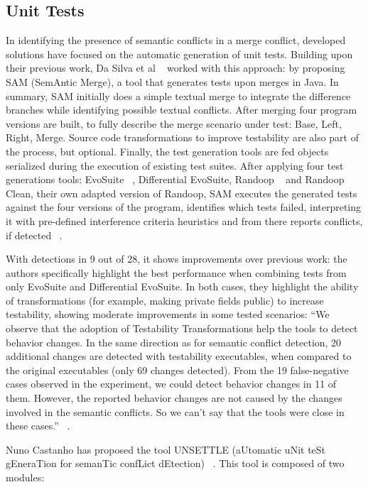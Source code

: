 \subsection{Unit Tests}

In identifying the presence of semantic conflicts in a merge conflict, developed solutions have focused on the automatic generation of unit tests. Building upon their previous work, Da Silva et al ~\citep{kn:leuson2} worked with this approach: by proposing SAM (SemAntic Merge), a tool that generates tests upon merges in Java. In summary, SAM initially does a simple textual merge to integrate the difference branches while identifying possible textual conflicts. After merging four program versions are built, to fully describe the merge scenario under test: Base, Left, Right, Merge. Source code transformations to improve testability are also part of the process, but optional. Finally, the test generation tools are fed objects serialized during the execution of existing test suites. After applying four test generations tools: EvoSuite ~\citep{kn:evosuite}, Differential EvoSuite, Randoop ~\citep{kn:randoop} and Randoop Clean, their own adapted version of Randoop, SAM executes the generated tests against the four versions of the program, identifies which tests failed, interpreting it with pre-defined interference criteria heuristics and from there reports conflicts, if detected ~\citep{kn:leuson2}.

With detections in 9 out of 28, it shows improvements over previous work: the authors specifically highlight the best performance when combining tests from only EvoSuite and Differential EvoSuite. In both cases, they highlight the ability of transformations (for example, making private fields public) to increase testability, showing moderate improvements in some tested scenarios: ``We observe that the adoption of Testability Transformations help the tools
to detect behavior changes. In the same direction as for semantic conflict
detection, 20 additional changes are detected with testability executables,
when compared to the original executables (only 69 changes detected). From
the 19 false-negative cases observed in the experiment, we could detect
behavior changes in 11 of them. However, the reported behavior changes are
not caused by the changes involved in the semantic conflicts. So we can’t say
that the tools were close in these cases.''  ~\citep{kn:leuson2}.


Nuno Castanho has proposed the tool UNSETTLE (aUtomatic uNit teSt gEneraTion for semanTic confLict dEtection) ~\citep{kn:nuno}. This tool is composed of two modules:

